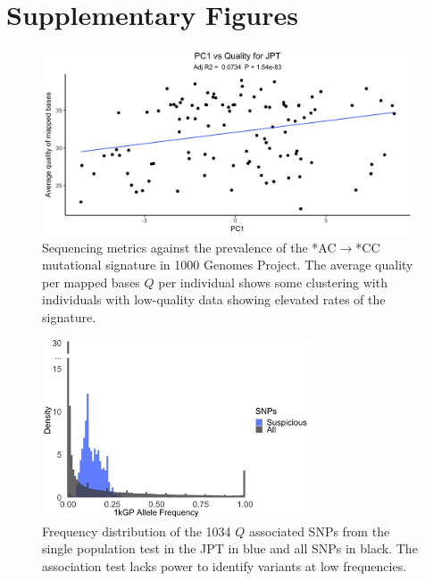 \documentclass[9pt,article]{template}
\begin{document}
\section{Supplementary Figures}
\clearpage


\renewcommand{\thefigure}{S\arabic{figure}}
\setcounter{figure}{0}   	

\begin{figure}[tbp]
\includegraphics[width=11cm,keepaspectratio]{PC1_Correlation.jpg}
\caption{Sequencing metrics against the prevalence of the  *AC${\rightarrow}$*CC mutational signature in 1000 Genomes Project. 
The average quality per mapped bases $Q$ per individual shows some clustering with individuals with low-quality data showing elevated rates of the signature.  }
\label{PC1_Correlation}
\end{figure}


\begin{figure}
\centering
\includegraphics[width=8cm,keepaspectratio]{histogram_of_sig_snps.jpg}
\caption{Frequency distribution of the 1034 $Q$ associated SNPs from the single population test in the JPT in blue and all SNPs in black. The association test lacks power to identify variants at low frequencies.}  
\label{histogram_of_sig_snps}
\end{figure}
\end{document}
